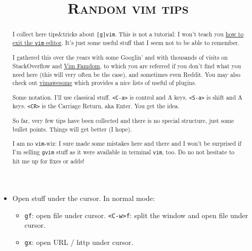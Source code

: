 \documentclass[a4paper,12pt,%
              final%
              ]{article}
\title{\color{\maincolor}\Huge\bfseries\scshape Random vim tips}
\author{\vspace{-7ex}}
\date{\vspace{-7ex}}
\begin{document}
%
%
\maketitle
%
\vspace*{-2.5cm}

\begin{abstract}
\parindent=0pt
\setlength{\parskip}{2pt}
\noindent
I collect here tips\&tricks about \texttt{[g]vim}. This is not a tutorial: I won't
teach you
\href{https://stackoverflow.com/questions/11828270/how-do-i-exit-the-vim-editor}{how
to exit the \texttt{vim} editor}. It's just some useful stuff that I seem not to be
able to remember.

I gathered this over the years with some Googlin' and with thousands of visits on
StackOverflow and \href{https://vim.fandom.com/wiki/Vim_Tips_Wiki}{Vim Famdom}, to
which you are referred if you don't find what you need here (this will very often be
the case), and sometimes even Reddit. You may also check out
\href{https://vimawesome.com/}{vimawesome} which provides a nice lists of useful of
plugins.

Some notation. I'll use classical stuff. \texttt{<C-a>} is control and A keys.
\texttt{<S-a>} is shift and A keys. \texttt{<CR>} is the Carriage Return, aka Enter.
You get the idea.

So far, very few tips have been collected and there is no special structure, just
some bullet points. Things will get better (I hope).

I am no \texttt{vim}-wiz: I sure made some mistakes here and there and I won't be
surprised if I'm selling \texttt{gvim} stuff as it were available in terminal
\texttt{vim}, too. Do no not hesitate to hit me up for fixes or adds!
\end{abstract}
%
\begin{itemize}
  \item Open stuff under the cursor. In normal mode:
    \begin{itemize}
      \item \texttt{gf}: open file under cursor. \texttt{<C-w>f}: split the window
        and open file under cursor.
      \item \texttt{gx}: open URL / http under cursor.
    \end{itemize}
\end{itemize}
%
%
\end{document}
